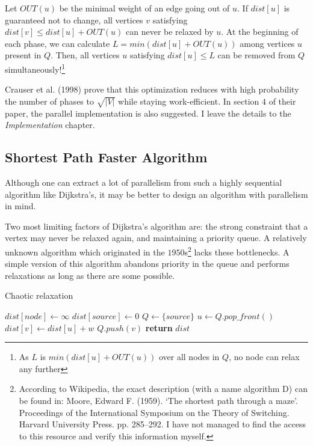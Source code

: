 \documentclass[12pt,a4paper,twoside,openright]{report}
\begin{document}
Let $OUT(u)$ be the minimal weight of an edge going out of $u$. If $dist[u]$ is guaranteed not to change, all vertices $v$ satisfying $dist[v] \leq dist[u] + OUT(u)$ can never be relaxed by $u$. At the beginning of each phase, we can calculate $L = min(dist[u] + OUT(u))$ among vertices $u$ present in $Q$. Then, all vertices $u$ satisfying $dist[u] \leq L$ can be removed from $Q$ simultaneously!\footnote{As $L$ is $min(dist[u] + OUT(u))$ over all nodes in $Q$, no node can relax any further}

Crauser et al. (1998)\cite{dijkstra} prove that this optimization reduces with high probability the number of phases to $\sqrt{|V|}$ while staying work-efficient. In section $4$ of their paper, the parallel implementation is also suggested. I leave the details to the \textit{Implementation} chapter.

\subsection{Shortest Path Faster Algorithm}
Although one can extract a lot of parallelism from such a highly sequential algorithm like Dijkstra's, it may be better to design an algorithm with parallelism in mind. 

Two most limiting factors of Dijkstra's algorithm are: the strong constraint that a vertex may never be relaxed again, and maintaining a priority queue. A relatively unknown algorithm which originated in the $1950$s\footnote{According to Wikipedia, the exact description (with a name algorithm D) can be found in:  Moore, Edward F. (1959).  `The shortest path through a maze'.  Proceedings of the International Symposium on the Theory of Switching.  Harvard University Press.  pp.  285–292. I have not managed to find the access to this resource and verify this information myself.} lacks these bottlenecks. A simple version of this algorithm abandons priority in the queue and performs relaxations as long as there are some possible.

\begin{algorithm}
\caption{Chaotic relaxation}\label{chaotic}
\begin{algorithmic}[1]
    \State $dist[node] \gets \infty$
\EndFor
\State $dist[source] \gets 0$
\State $Q \gets \{source\}$ 
        \State $u \gets Q.pop\_front()$
            \State $dist[v] \gets dist[u] + w$
            \State $Q.push(v)$
        \EndIf
      \EndFor
    \EndWhile
\State \textbf{return} $dist$
\EndProcedure
\end{algorithmic}
\end{algorithm}
\end{document}
